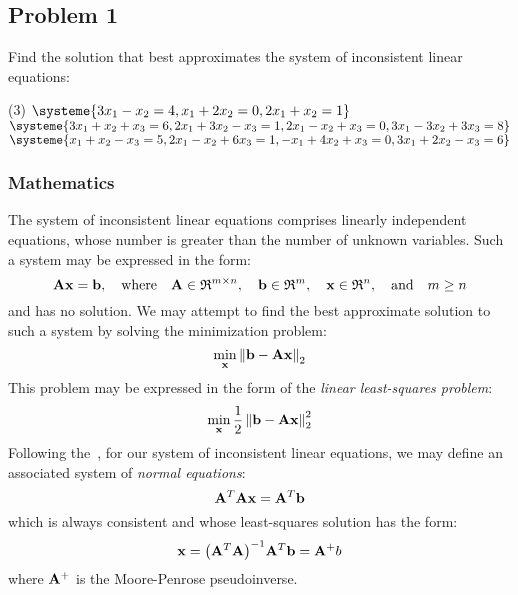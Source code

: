 \subsection{Problem 1}%
\label{sec:problem_1}
Find the solution that best approximates the system of inconsistent linear equations:
\begin{tasks}(3)
  \task\label{problem:1_a} $\systeme{3x_1-x_2=4,x_1+2x_2=0,2x_1+x_2=1}$
  \task\label{problem:1_b} $\systeme{3x_1+x_2+x_3=6,
  2x_1+3x_2-x_3=1,
  2x_1-x_2+x_3=0,
  3x_1-3x_2+3x_3=8}$
  \task\label{problem:1_c} $\systeme{x_1+x_2-x_3=5,
  2x_1-x_2+6x_3=1,
  -x_1+4x_2+x_3=0,
  3x_1+2x_2-x_3=6}$
\end{tasks}
\subsubsection*{Mathematics}
The system of inconsistent linear equations comprises linearly independent equations,
whose number is greater than the number of unknown variables.
Such a system may be expressed in the form:
\begin{equation*}
  \mathbf{Ax}=\mathbf{b}, \quad \text{where} \quad
  \mathbf{A}\in\mathfrak{R}^{m\times{}n}, \quad
  \mathbf{b}\in\mathfrak{R}^m, \quad
  \mathbf{x}\in\mathfrak{R}^n, \quad \text{and} \quad m\geq{}n
\end{equation*}
and has no solution. We may attempt to find the best approximate solution to such a
system by solving the minimization problem:
\begin{equation*}
  \min_{\mathbf{x}}{\left\lVert\mathbf{b}-\mathbf{A}\mathbf{x}\right\rVert}_2
\end{equation*}
This problem may be expressed in the form of the \textit{linear least-squares problem}:
\begin{equation*}
  \min_{\mathbf{x}}{\frac{1}{2}\left\lVert\mathbf{b}-\mathbf{A}\mathbf{x}\right\rVert_2^2}
\end{equation*}
Following the~\cite{Zdunek}, for our system of inconsistent linear equations, we may
define an associated system of \textit{normal equations}:
\begin{equation*}
  \mathbf{A}^T\mathbf{Ax}=\mathbf{A}^T\mathbf{b}
\end{equation*}
which is always consistent and whose least-squares solution has the form:
\begin{equation}
  \label{eq:normal_approximation}
  \mathbf{x}={\left(\mathbf{A}^T\mathbf{A}\right)}^{-1}\mathbf{A}^T\mathbf{b}=\mathbf{A}^{+}b
\end{equation}
where $\mathbf{A}^{+}$ is the Moore-Penrose pseudoinverse.
